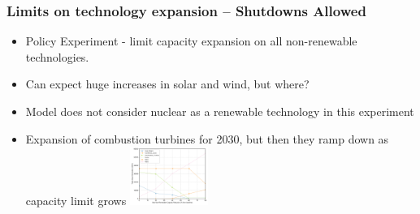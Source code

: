 \documentclass[xcolor=dvipsnames]{beamer}
\begin{document}
%
%


\begin{frame}
  \frametitle{Limits on technology expansion -- Shutdowns Allowed}
\begin{itemize}
 \item Policy Experiment - limit capacity expansion on all non-renewable technologies.
 \item Can expect huge increases in solar and wind, but where?
 \item Model does not consider nuclear as a renewable technology in this experiment
 \item Expansion of combustion turbines for 2030, but then they ramp down as capacity limit grows
  \includegraphics[width=0.2\textwidth]{includes/no_leakage_maxNR_agg_generation_cntlreg.png} \\


\end{itemize}
\end{frame}
\end{document}
